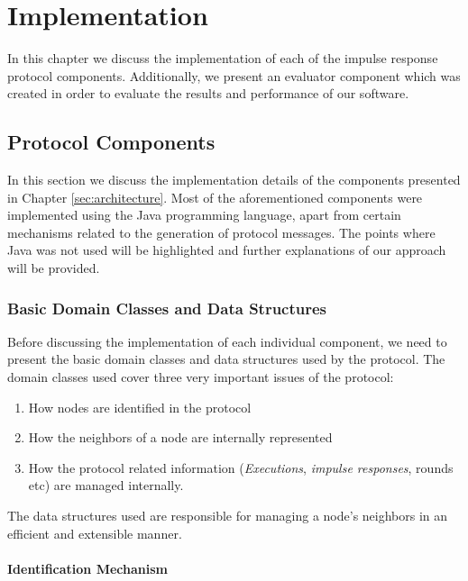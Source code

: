 \documentclass[a4paper,11pt,twoside]{report}
\begin{document}
\chapter{Implementation}
\label{sec:implementation}

In this chapter we discuss the implementation of each of the impulse response protocol components. Additionally, we present an evaluator component which was created in order to evaluate the results and performance of our software.

\section{Protocol Components}

In this section we discuss the implementation details of the components presented in Chapter \ref{sec:architecture}. Most of the aforementioned components were implemented using the Java programming language, apart from certain mechanisms related to the generation of protocol messages. The points where Java was not used will be highlighted and further explanations of our approach will be provided.

\subsection{Basic Domain Classes and Data Structures}
\label{sec:basic_domain}

Before discussing the implementation of each individual component, we need to present the basic domain classes and data structures used by the protocol. The domain classes used cover three very important issues of the protocol:


\begin{enumerate}
  \item How nodes are identified in the protocol
  \item How the neighbors of a node are internally represented
  \item How the protocol related information (\textit{Executions}, \textit{impulse responses}, rounds etc) are managed internally.
\end{enumerate}

The data structures used are responsible for managing a node's neighbors in an efficient and extensible manner. 


\subsubsection*{Identification Mechanism}
\end{document}
